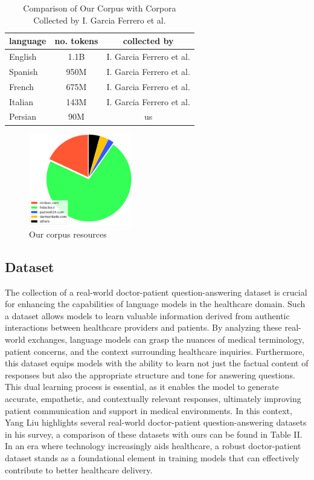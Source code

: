 \documentclass[conference]{IEEEtran}
\begin{document}
	\begin{table}[ht]
		\centering
		\caption{Comparison of Our Corpus with Corpora Collected by I. Garcia Ferrero et al.}
		\begin{tabular}{|l|c|c|}  %
			\hline
			language& no. tokens & collected by \\ \hline
			English & 1.1B & I. Garcia Ferrero et al. \\ \hline
			Spanish & 950M & I. Garcia Ferrero et al.  \\ \hline
			French & 675M & I. Garcia Ferrero et al.  \\ \hline
			Italian& 143M &  I. Garcia Ferrero et al.  \\ \hline
			Persian& 90M & us	\\ \hline
		\end{tabular}
		\label{tab:model_results_on_mcqa}
	\end{table}
	
	\begin{figure}[htbp]
		\centerline{\includegraphics[width=0.4\textwidth]{fig1.png}}
		\caption{Our corpus resources}
		\label{fig1}
	\end{figure}
	
	\subsection{Dataset}
	The collection of a real-world doctor-patient question-answering dataset is crucial for enhancing the capabilities of language models in the healthcare domain. Such a dataset allows models to learn valuable information derived from authentic interactions between healthcare providers and patients. By analyzing these real-world exchanges, language models can grasp the nuances of medical terminology, patient concerns, and the context surrounding healthcare inquiries. Furthermore, this dataset equips models with the ability to learn not just the factual content of responses but also the appropriate structure and tone for answering questions. This dual learning process is essential, as it enables the model to generate accurate, empathetic, and contextually relevant responses, ultimately improving patient communication and support in medical environments. In this context, Yang Liu 
	\cite{b20}
	highlights several real-world doctor-patient question-answering datasets in his survey, a comparison of these datasets with ours can be found in Table II. In an era where technology increasingly aids healthcare, a robust doctor-patient dataset stands as a foundational element in training models that can effectively contribute to better healthcare delivery.
	
\end{document}
